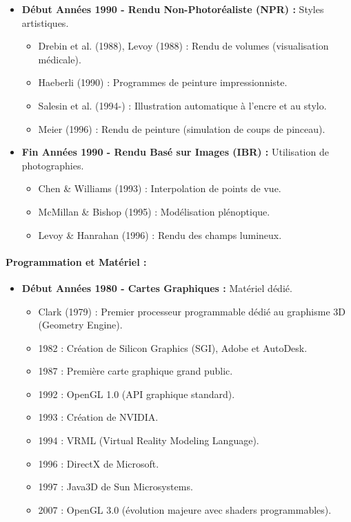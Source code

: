 \documentclass{article}
\begin{document}
\begin{itemize}
\begin{itemize}
    \end{itemize}
    \item \textbf{Début Années 1990 - Rendu Non-Photoréaliste (NPR) :} Styles artistiques.
    \begin{itemize}
        \item Drebin et al. (1988), Levoy (1988) : Rendu de volumes (visualisation médicale).
        \item Haeberli (1990) : Programmes de peinture impressionniste.
        \item Salesin et al. (1994-) : Illustration automatique à l'encre et au stylo.
        \item Meier (1996) : Rendu de peinture (simulation de coups de pinceau).
    \end{itemize}
    \item \textbf{Fin Années 1990 - Rendu Basé sur Images (IBR) :} Utilisation de photographies.
    \begin{itemize}
        \item Chen \& Williams (1993) : Interpolation de points de vue.
        \item McMillan \& Bishop (1995) : Modélisation plénoptique.
        \item Levoy \& Hanrahan (1996) : Rendu des champs lumineux.
    \end{itemize}
\end{itemize}

\paragraph{Programmation et Matériel :}
\begin{itemize}
    \item \textbf{Début Années 1980 - Cartes Graphiques :} Matériel dédié.
    \begin{itemize}
        \item Clark (1979) : Premier processeur programmable dédié au graphisme 3D (Geometry Engine).
        \item 1982 : Création de Silicon Graphics (SGI), Adobe et AutoDesk.
        \item 1987 : Première carte graphique grand public.
        \item 1992 : OpenGL 1.0 (API graphique standard).
        \item 1993 : Création de NVIDIA.
        \item 1994 : VRML (Virtual Reality Modeling Language).
        \item 1996 : DirectX de Microsoft.
        \item 1997 : Java3D de Sun Microsystems.
        \item 2007 : OpenGL 3.0 (évolution majeure avec shaders programmables).
    \end{itemize}
\end{itemize}
\end{document}
